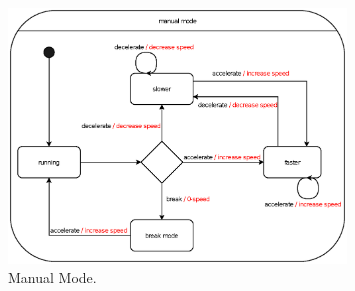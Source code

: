 \documentclass[12pt]{article}
\begin{document}
\begin{spacing}{1.5}
\begin{figure}[h!]
	\centering
		\includegraphics[width=0.8\textwidth]{./A2_Figures/4.2-Manual-mode.eps}
		  \caption{Manual Mode.}
  \label{fig:manual-mode-fig}
\end{figure}

\end{spacing}
\end{document}

